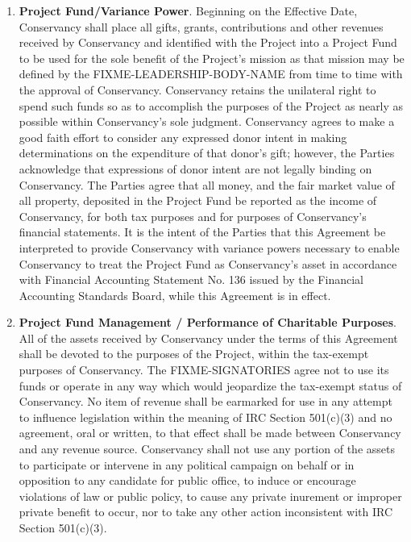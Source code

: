 \documentclass[letterpaper,12pt]{article}
\newcommand{\signatories}{FIXME-SIGNATORIES\xspace}
\newcommand{\leadershipbody}{FIXME-LEADERSHIP-BODY-NAME\xspace}
\begin{document}
\begin{enumerate}[label=\arabic*.,ref=\S~\arabic*]
Notwithstanding the above, the \signatories agree that should Conservancy
be required to pay any taxes (including but not limited to sales taxes
and unrelated business taxable income) as the result of any activity
of the Project and/or activities undertaken by Conservancy on the
Project's behalf, such taxes shall be deducted from the Project Fund.


Conservancy will monitor any unrelated business taxable income and
may require the Project to cease activities generating such income
if the overall amounts exceed amounts permissible or prudent for Conservancy,
given Conservancy's tax exempt status.

\item \textbf{Project Fund/Variance Power}. Beginning on the Effective Date,
Conservancy shall place all gifts, grants, contributions and other
revenues received by Conservancy and identified with the Project into
a Project Fund to be used for the sole benefit of the Project's mission
as that mission may be defined by the \leadershipbody from
time to time with the approval of Conservancy. Conservancy retains
the unilateral right to spend such funds so as to accomplish the purposes
of the Project as nearly as possible within Conservancy's sole judgment.
Conservancy agrees to make a good faith effort to consider any expressed
donor intent in making determinations on the expenditure of that donor's
gift; however, the Parties acknowledge that expressions of donor intent
are not legally binding on Conservancy. The Parties agree that all
money, and the fair market value of all property, deposited in the
Project Fund be reported as the income of Conservancy, for both tax
purposes and for purposes of Conservancy's financial statements. It
is the intent of the Parties that this Agreement be interpreted to
provide Conservancy with variance powers necessary to enable Conservancy
to treat the Project Fund as Conservancy's asset in accordance with
Financial Accounting Statement No. 136 issued by the Financial Accounting
Standards Board, while this Agreement is in effect. 
\item \textbf{Project Fund Management / Performance of Charitable Purposes}.
\label{CharitablePurpose} All of the assets received by Conservancy
under the terms of this Agreement shall be devoted to the purposes
of the Project, within the tax-exempt purposes of Conservancy. The
\signatories agree not to use its funds or operate in any way which would
jeopardize the tax-exempt status of Conservancy. No item of revenue
shall be earmarked for use in any attempt to influence legislation
within the meaning of IRC Section 501(c)(3) and no agreement, oral
or written, to that effect shall be made between Conservancy and any
revenue source. Conservancy shall not use any portion of the assets
to participate or intervene in any political campaign on behalf or
in opposition to any candidate for public office, to induce or encourage
violations of law or public policy, to cause any private inurement
or improper private benefit to occur, nor to take any other action
inconsistent with IRC Section 501(c)(3). 


\end{enumerate}
\end{document}
